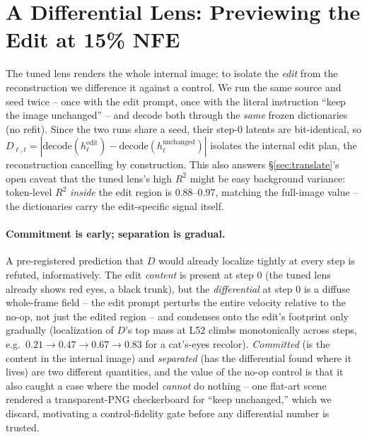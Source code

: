 \section{A Differential Lens: Previewing the Edit at 15\% NFE}\label{sec:difflens}

The tuned lens renders the whole internal image; to isolate the
\emph{edit} from the reconstruction we difference it against a control.
We run the same source and seed twice -- once with the edit prompt, once
with the literal instruction ``keep the image unchanged'' -- and decode
both through the \emph{same} frozen dictionaries (no refit). Since the two
runs share a seed, their step-0 latents are bit-identical, so
$D_{\ell,t}=|\text{decode}(h_\ell^{\text{edit}})-\text{decode}(h_\ell^{\text{unchanged}})|$
isolates the internal edit plan, the reconstruction cancelling by
construction. This also answers \S\ref{sec:translate}'s open caveat that
the tuned lens's high $R^2$ might be easy background variance: token-level
$R^2$ \emph{inside} the edit region is $0.88$--$0.97$, matching the
full-image value -- the dictionaries carry the edit-specific signal
itself.

\paragraph{Commitment is early; separation is gradual.} A pre-registered
prediction that $D$ would already localize tightly at every step is
refuted, informatively. The edit \emph{content} is present at step 0 (the
tuned lens already shows red eyes, a black trunk), but the
\emph{differential} at step 0 is a diffuse whole-frame field -- the edit
prompt perturbs the entire velocity relative to the no-op, not just the
edited region -- and condenses onto the edit's footprint only gradually
(localization of $D$'s top mass at L52 climbs monotonically across steps,
e.g.\ $0.21{\to}0.47{\to}0.67{\to}0.83$ for a cat's-eyes recolor).
\emph{Committed} (is the content in the internal image) and
\emph{separated} (has the differential found where it lives) are two
different quantities, and the value of the no-op control is that it also
caught a case where the model \emph{cannot} do nothing -- one flat-art
scene rendered a transparent-PNG checkerboard for ``keep unchanged,''
which we discard, motivating a control-fidelity gate before any
differential number is trusted.

